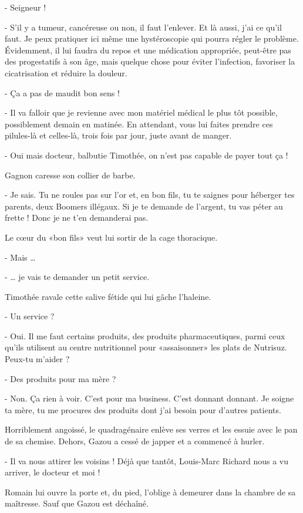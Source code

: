 - Seigneur !

- S’il y a tumeur, cancéreuse ou non, il faut l’enlever. Et là aussi, j’ai ce qu’il faut. Je peux pratiquer ici même une hystéroscopie qui pourra régler le problème. Évidemment, il lui faudra du repos et une médication appropriée, peut-être pas des progestatifs à son âge, mais quelque chose pour éviter l’infection, favoriser la cicatrisation et réduire la douleur.

- Ça a pas de maudit bon sens !

- Il va falloir que je revienne avec mon matériel médical le plus tôt possible, possiblement demain en matinée. En attendant, vous lui faites prendre ces pilules-là et celles-là, trois fois par jour, juste avant de manger.

- Oui mais docteur, balbutie Timothée, on n’est pas capable de payer tout ça !

Gagnon caresse son collier de barbe.

- Je sais. Tu ne roules pas sur l’or et, en bon fils, tu te saignes pour héberger tes parents, deux Boomers illégaux. Si je te demande de l’argent, tu vas péter au frette ! Donc je ne t’en demanderai pas.

Le cœur du «bon fils» veut lui sortir de la cage thoracique.

- Mais …

- … je vais te demander un petit service.

Timothée ravale cette salive fétide qui lui gâche l’haleine.

- Un service ?

- Oui. Il me faut certains produits, des produits pharmaceutiques, parmi ceux qu’ils utilisent au centre nutritionnel pour «assaisonner» les plats de Nutrisuz. Peux-tu m’aider ?

- Des produits pour ma mère ?

- Non. Ça rien à voir. C’est pour ma business. C’est donnant donnant. Je soigne ta mère, tu me procures des produits dont j’ai besoin pour d’autres patients.

Horriblement angoissé, le quadragénaire enlève ses verres et les essuie avec le pan de sa chemise. Dehors, Gazou a cessé de japper et a commencé à hurler.

- Il va nous attirer les voisins ! Déjà que tantôt, Louis-Marc Richard nous a vu arriver, le docteur et moi !

Romain lui ouvre la porte et, du pied, l’oblige à demeurer dans la chambre de sa maîtresse. Sauf que Gazou est déchaîné.

